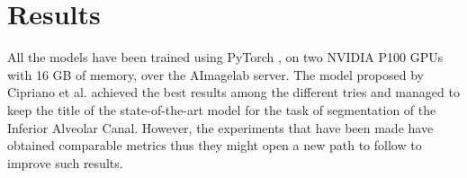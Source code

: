 \section{Results}
All the models have been trained using PyTorch \cite{paszke2019pytorch}, on two
NVIDIA P100 GPUs with 16 GB of memory, over the AImagelab server.
The model proposed by Cipriano et al. achieved the best results among the
different tries and managed to keep the title of the state-of-the-art model for
the task of segmentation of the Inferior Alveolar Canal. However, the
experiments that have been made have obtained comparable metrics thus they might
open a new path to follow to improve such results.

